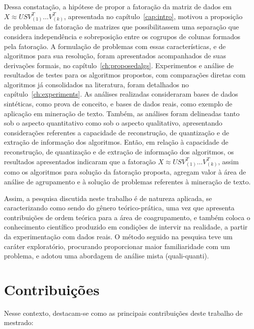 \documentclass[
    12pt,                %
    oneside,            %
    a4paper,            %
    english,            %
    brazil                %
    ]{abntex2ppgsi}
\begin{document}
Dessa constatação, a hipótese de propor a fatoração da matriz de dados em $X \approx USV_{(1)}^T \dots V_{(k)}^T$, apresentada no capítulo~\ref{cap:intro}, motivou a proposição de problemas de fatoração de matrizes que possibilitassem uma separação que considera independência e sobreposição entre os cogrupos de colunas formados pela fatoração.
A formulação de problemas com essas características, e de algoritmos para sua resolução, foram apresentados acompanhados de suas derivações formais, no capítulo~\ref{ch:proposedalgs}.
Experimentos e análise de resultados de testes para os algoritmos propostos, com comparações diretas com algoritmos já consolidados na literatura, foram detalhados no capítulo~\ref{ch:experiments}.
As análises realizadas consideraram bases de dados sintéticas, como prova de conceito, e bases de dados reais, como exemplo de aplicação em mineração de texto.
Também, as análises foram delineadas tanto sob o aspecto quantitativo como sob o aspecto qualitativo, apresentando considerações referentes a capacidade de reconstrução, de quantização e de extração de informação dos algoritmos.
Então, em relação à capacidade de reconstrução, de quantização e de extração de informação dos algoritmos, os resultados apresentados indicaram que a fatoração $X \approx USV_{(1)}^T \dots V_{(k)}^T$, assim como os algoritmos para solução da fatoração proposta, agregam valor à área de análise de agrupamento e à solução de problemas referentes à mineração de texto.

Assim, a pesquisa discutida neste trabalho é de natureza aplicada, se caracterizando como sendo do gênero teórico-prática, uma vez que apresenta contribuições de ordem teórica para a área de coagrupamento, e também coloca o conhecimento científico produzido em condições de intervir na realidade, a partir da experimentação com dados reais. O método seguido na pesquisa teve um caráter exploratório, procurando proporcionar maior familiaridade com um problema, e adotou uma abordagem de análise mista (quali-quanti).

\section{Contribuições}

Nesse contexto, destacam-se como as principais contribuições deste trabalho de mestrado:
\end{document}
